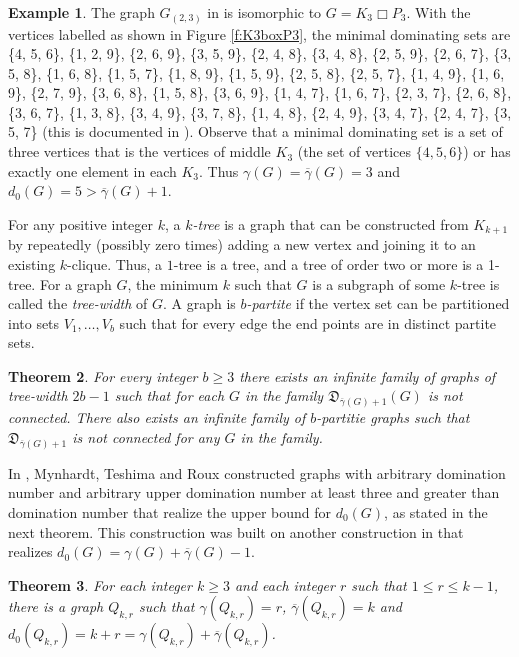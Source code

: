 \documentclass{article}
\numberwithin{figure}{section}
\numberwithin{table}{section}
\numberwithin{equation}{section}
\newtheorem{thm}{Theorem}[section]
\theoremstyle{definition}
\theoremstyle{definition}
\theoremstyle{definition}
\newtheorem{ex}[thm]{Example}
\newcommand{\ol}{\overline}
\newcommand{\dbar}{\ol\gamma}
\newcommand{\dtar}{\mathfrak{D}}%
\newcommand{\ddo}{d_0}
\begin{document}
{\begin{ex}
The graph $G_{(2,3)}$ in \cite{SMN14} is isomorphic to $G=K_3 \Box P_3$.    With the vertices labelled as shown in Figure \ref{f:K3boxP3}, the minimal dominating sets are \{4, 5, 6\}, \{1, 2, 9\},
 \{2, 6, 9\},
 \{3, 5, 9\},
 \{2, 4, 8\},
 \{3, 4, 8\},
 \{2, 5, 9\},
 \{2, 6, 7\},
 \{3, 5, 8\},
 \{1, 6, 8\},
 \{1, 5, 7\},
 \{1, 8, 9\},
 \{1, 5, 9\},
 \{2, 5, 8\},
 \{2, 5, 7\},
 \{1, 4, 9\},
 \{1, 6, 9\},
 \{2, 7, 9\},
 \{3, 6, 8\},
 \{1, 5, 8\},
 \{3, 6, 9\},
 \{1, 4, 7\},
 \{1, 6, 7\},
 \{2, 3, 7\},
 \{2, 6, 8\},
 \{3, 6, 7\},
 \{1, 3, 8\},
 \{3, 4, 9\},
 \{3, 7, 8\},
 \{1, 4, 8\},
 \{2, 4, 9\},
 \{3, 4, 7\},
 \{2, 4, 7\},
 \{3, 5, 7\} (this is documented in \cite{sage:recon}).  Observe that a  minimal dominating set is a set of three vertices that is the vertices of middle $K_3$ (the set of vertices $\{4,5,6\}$) or  has exactly one element in each $K_3$. Thus  $\gamma(G)=\dbar(G)=3$ and $\ddo(G)=5>\dbar(G)+1$. 
\end{ex}


For any positive integer $k$, a \emph{$k$-tree} is a graph that can be constructed from $K_{k+1}$ by repeatedly (possibly zero times) adding a new vertex and joining it to an existing $k$-clique.  Thus, a $1$-tree is a tree, and a tree of order two or more is a 1-tree.  
For a graph $G$, the minimum $k$ such that $G$ is a subgraph of some $k$-tree is called the \emph{tree-width} of $G$.  A graph is \emph{$b$-partite} if 
the  vertex set can be partitioned into sets $V_1,\dots,V_b$  such that  for every edge the end points are in distinct partite sets.

\begin{thm}\label{dkupperbound}{\rm\cite{SMN14}}
    For every integer $b \ge 3$ there exists an infinite family of graphs of tree-width $2b-1$ such that for each $G$ in the family $\dtar_{\dbar(G)+1}(G)$ is not connected. There also exists an infinite family of $b$-partitie graphs such that $\dtar_{\dbar(G)+1}$ is not connected for any $G$ in the family.
\end{thm}

In \cite{MTR19}, Mynhardt, Teshima and Roux  constructed graphs with arbitrary domination number and   arbitrary upper domination number  at least three and greater than domination number that  realize the upper bound for $\ddo(G)$, as stated in the next theorem.  This construction was built on another construction in \cite{MTR19} that realizes $\ddo(G)=\gamma(G)+\dbar(G)-1$. 

\begin{thm}\label{ddomaximum}{\rm\cite{MTR19}}
For each integer $k \ge 3$ and each integer $r$ such that $1 \leq r \leq k-1$, there is a graph $Q_{k,r}$ such that $\gamma(Q_{k,r})=r$, $\dbar(Q_{k,r})=k$ and $\ddo(Q_{k,r})=k+r=\gamma(Q_{k,r})+\dbar(Q_{k,r})$.
\end{thm}

}
\end{document}
